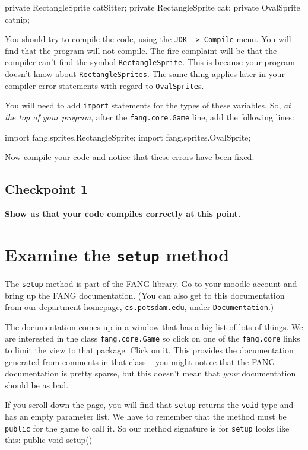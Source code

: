 \documentclass[12pt]{article}
\newcommand{\fname}[1]{\texttt{#1}}
\newcommand{\code}[1]{\texttt{#1}}
\newenvironment{qv}%
  {\quote
   \verbatim}%
  {\endverbatim
   \endquote}
\begin{document}
\begin{qv}
private RectangleSprite catSitter;
private RectangleSprite cat;
private OvalSprite catnip;
\end{qv}

You should try to compile the code, using the
\fname{JDK -> Compile} menu.
You will find that the program will not compile.
The fire complaint will be that
the compiler can't find the symbol
\code{RectangleSprite}.
This is because your program doesn't know about \code{RectangleSprites}.
The same thing applies later in your compiler error statements
with regard to \code{OvalSprite}s.

You will need to add \code{import} statements
for the types of these variables,
So, \emph{at the top of your program},
after the \code{fang.core.Game} line, add the following lines:

\begin{qv}
import fang.sprites.RectangleSprite;
import fang.sprites.OvalSprite;
\end{qv}

Now compile your code
and notice that these errors have been fixed.

\subsection*{Checkpoint 1}
{\bf Show us that your code compiles correctly at this point.}

\section{Examine the \code{setup} method}

The \code{setup} method is part of the FANG library.
Go to your moodle account and bring up the FANG documentation.
(You can also get to this documentation from
our department homepage, \fname{cs.potsdam.edu},
under \fname{Documentation}.)

The documentation comes up in a window that has a big list of lots of
things. We are interested in the class \fname{fang.core.Game} so click
on one of the \fname{fang.core} links to limit the view to that
package.
Click on it. This provides the documentation generated from
comments in that class
-- you might notice that the FANG documentation is pretty sparse,
but this doesn't mean that {\em your} documentation should be as bad.

If you scroll down the page, you will find that \code{setup} returns the
\code{void} type and has an empty parameter list. We have to remember
that the method must be \code{public} for the game to call it. So our
method signature is for \code{setup} looks like this:
\begin{qv}
public void setup() 
\end{qv}
\end{document}
